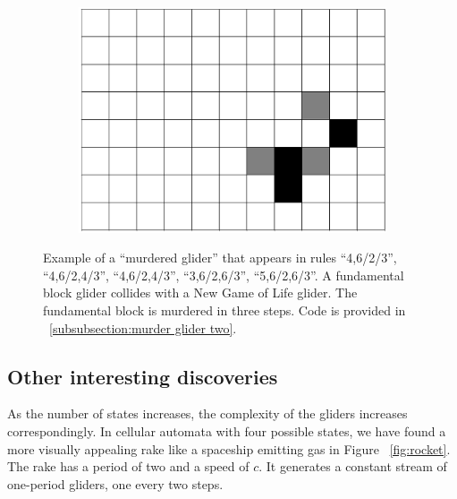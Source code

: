 \documentclass[12pt]{article}
\numberwithin{figure}{section} %
\begin{document}
\begin{figure}[H]
\begin{subfigure}{0.22\textwidth}
     		\subcaption{}
   	\end{subfigure}
        	\begin{subfigure}{0.22\textwidth}
     		\centering
     		\includegraphics[width=\linewidth]{Section4/33.7}
     		\subcaption{}
   	\end{subfigure}
   	\caption[Another example of a "murdered glider"]{Example of a “murdered glider” that appears in rules “4,6/2/3”, “4,6/2,4/3”, “4,6/2,4/3”, “3,6/2,6/3”, “5,6/2,6/3”. A fundamental block glider collides with a New Game of Life glider. The fundamental block is murdered in three steps. Code is provided in ~\ref{subsubsection:murder glider two}. }
   	\label{fig:murder glider two}
	\vspace{-1.5em}
\end{figure}
\subsection{Other interesting discoveries}
As the number of states increases, the complexity of the gliders increases correspondingly. In cellular automata with four possible states, we have found a more visually appealing rake like a spaceship emitting gas in Figure ~\ref{fig:rocket}. The rake has a period of two and a speed of $c$. It generates a constant stream of one-period gliders, one every two steps. 
\end{document}
